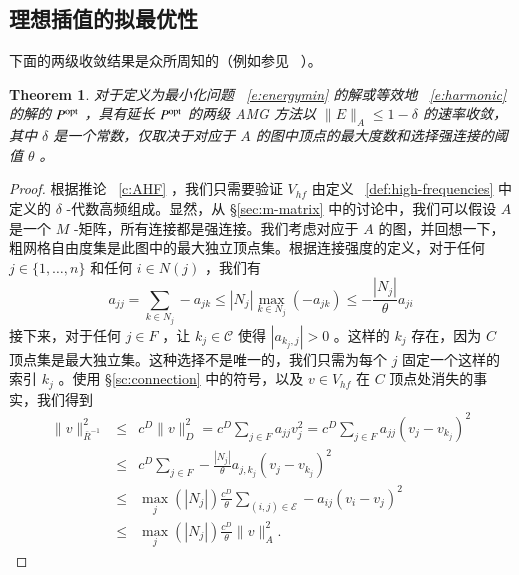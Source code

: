 \documentclass[12pt]{acta_2011xz}
\newtheorem{theorem}{Theorem}[section]
\begin{document}
   

   \subsection{理想插值的拟最优性  }     

下面的两级收敛结果是众所周知的（例如参见~
   \cite{2006MacLachlanS_ManteuffelT_McCormickS-aa}    ）。
   \begin{theorem}   \label{t:ideal-converges}    对于定义为最小化问题~    \eqref{e:energymin}    的解或等效地~    \eqref{e:harmonic}    的解的    $P^{\rm opt}$   ，具有延长    $P^{\rm opt}$    的两级 AMG 方法以
   $\|E\|_A\le 1-\delta$    的速率收敛，其中    $\delta$    是一个常数，仅取决于对应于
   $A$    的图中顶点的最大度数和选择强连接的阈值    $\theta$   。  \end{theorem}     

   \begin{proof}根据推论~    \ref{c:AHF}    ，我们只需要验证
   $V_{hf}$    由定义~    \ref{def:high-frequencies}    中定义的    $\delta$    -代数高频组成。显然，从    \S       \ref{sec:m-matrix}    中的讨论中，我们可以假设    $A$    是一个
   $M$    -矩阵，所有连接都是强连接。我们考虑对应于    $A$    的图，并回想一下，粗网格自由度集是此图中的最大独立顶点集。根据连接强度的定义，对于任何
   $j\in  \{ 1,\ldots,n \} $    和任何    $i\in N(j)$    ，我们有
   \begin{equation*}
        a_{jj} = \sum_{k\in N_j}-a_{jk}\le |N_j|\max_{k\in N_j}(-a_{jk})\le -\frac{|N_j|}{\theta}a_{ji}
    \end{equation*}    
接下来，对于任何    $j\in F$    ，让    $k_j\in \mathcal C$    使得
   $|a_{k_j, j}|>0$    。这样的    $k_j$    存在，因为
   $C$    顶点集是最大独立集。这种选择不是唯一的，我们只需为每个    $j$    固定一个这样的索引    $k_j$    。使用    \S       \ref{sc:connection}    中的符号，以及    $v\in V_{hf}$    在    $C$    顶点处消失的事实，我们得到
   \begin{eqnarray*}
      \|v\|_{\bar R^{-1}}^2 &\le& 
c^D\|v\|_D^2 = c^D\sum_{j\in F}a_{jj}v_j^2 = c^D\sum_{j\in F}a_{jj}(v_j-v_{k_j})^2 \\ 
                            & \le & c^D\sum_{j\in F}-\frac{|N_j|}{\theta}a_{j,k_j}(v_j-v_{k_j})^2 \\ 
                            &\le &\max_{j}(|N_j|) \frac{c^D}{\theta} \sum_{(i,j)\in \mathcal E}-a_{ij}(v_i-v_j)^2 \\ 
                            &\le & \max_{j}(|N_j|) \frac{c^D}{\theta}\|v\|_A^2.
    \end{eqnarray*}     \end{proof}     
\end{document}
